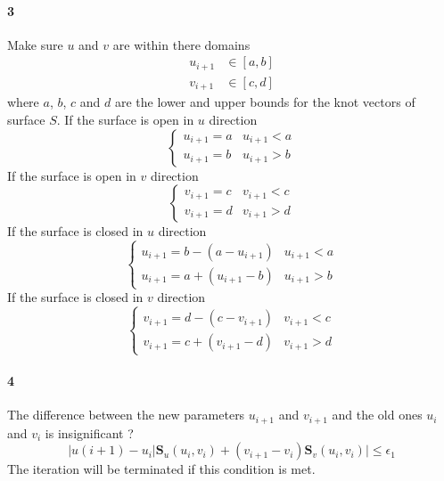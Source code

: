 \paragraph{3}
Make sure $u$ and $v$ are within there domains
\begin{align*}
    u_{i+1} & \in [a,b] \\
    v_{i+1} & \in [c,d]
\end{align*}
%
where $a$, $b$, $c$ and $d$ are the lower and upper bounds for the knot vectors of surface $S$.
If the surface is open in $u$ direction
\begin{equation}
    \left\{
        \begin{array}{rl}
            u_{i+1} = a & u_{i+1} < a \\
            u_{i+1} = b & u_{i+1} > b
        \end{array}
    \right.
\end{equation}
%
If the surface is open in $v$ direction
\begin{equation}
    \left\{
        \begin{array}{rl}
            v_{i+1} = c & v_{i+1} < c \\
            v_{i+1} = d & v_{i+1} > d
        \end{array}
    \right.
\end{equation}
%
If the surface is closed in $u$ direction
\begin{equation}
    \left\{
        \begin{array}{rl}
            u_{i+1} = b - ( a - u_{i+1} ) & u_{i+1} < a \\
            u_{i+1} = a + ( u_{i+1} - b ) & u_{i+1} > b
        \end{array}
    \right.
\end{equation}
%
If the surface is closed in $v$ direction
\begin{equation}
    \left\{
        \begin{array}{rl}
            v_{i+1} = d - ( c - v_{i+1} ) & v_{i+1} < c \\
            v_{i+1} = c + ( v_{i+1} - d ) & v_{i+1} > d
        \end{array}
    \right.
\end{equation}
%
\paragraph{4}
The difference between the new parameters $u_{i+1}$ and $v_{i+1}$ and the old ones $u_i$ and $v_i$ is insignificant ?
\begin{equation*}
    |u(i+1) - u_i| \mathbf{S}_u (u_i, v_i) +
    (v_{i+1} - v_i) \mathbf{S}_v (u_i, v_i) |
    \leq \epsilon_1
\end{equation*}
The iteration will be terminated if this condition is met.